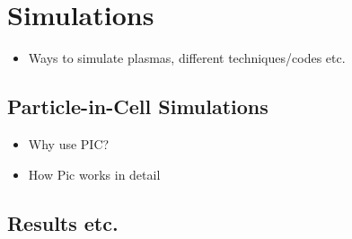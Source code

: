 \chapter{Simulations}
\begin{itemize}
\item Ways to simulate plasmas, different techniques/codes etc.
\end{itemize}
\section{Particle-in-Cell Simulations}
\begin{itemize}
\item Why use PIC?
\item How Pic works in detail
\end{itemize}
\section{Results etc.}

